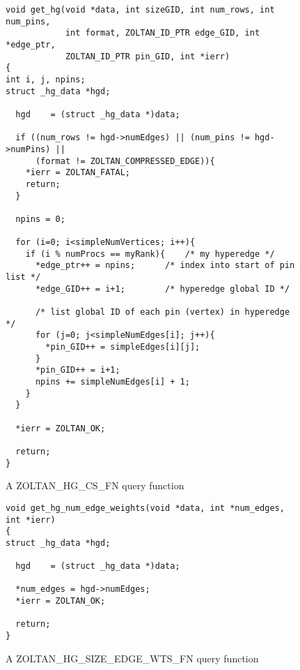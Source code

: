 \begin{figure}
\begin{flushleft}
\begin{verbatim}
void get_hg(void *data, int sizeGID, int num_rows, int num_pins,
            int format, ZOLTAN_ID_PTR edge_GID, int *edge_ptr,
            ZOLTAN_ID_PTR pin_GID, int *ierr)
{
int i, j, npins;
struct _hg_data *hgd;

  hgd    = (struct _hg_data *)data;

  if ((num_rows != hgd->numEdges) || (num_pins != hgd->numPins) ||
      (format != ZOLTAN_COMPRESSED_EDGE)){
    *ierr = ZOLTAN_FATAL;
    return;
  }

  npins = 0;

  for (i=0; i<simpleNumVertices; i++){
    if (i % numProcs == myRank){    /* my hyperedge */
      *edge_ptr++ = npins;      /* index into start of pin list */
      *edge_GID++ = i+1;        /* hyperedge global ID */

      /* list global ID of each pin (vertex) in hyperedge */
      for (j=0; j<simpleNumEdges[i]; j++){
        *pin_GID++ = simpleEdges[i][j];
      }
      *pin_GID++ = i+1;
      npins += simpleNumEdges[i] + 1;
    }
  }

  *ierr = ZOLTAN_OK;

  return;
}
\end{verbatim}
\end{flushleft}
\caption{A ZOLTAN\_HG\_CS\_FN query function}
\label{fig:CS}
\end{figure}

\begin{figure}
\begin{flushleft}
\begin{verbatim}
void get_hg_num_edge_weights(void *data, int *num_edges, int *ierr)
{
struct _hg_data *hgd;

  hgd    = (struct _hg_data *)data;

  *num_edges = hgd->numEdges;
  *ierr = ZOLTAN_OK;

  return;
}
\end{verbatim}
\end{flushleft}
\caption{A ZOLTAN\_HG\_SIZE\_EDGE\_WTS\_FN query function}
\label{fig:SizeEW}
\end{figure}


